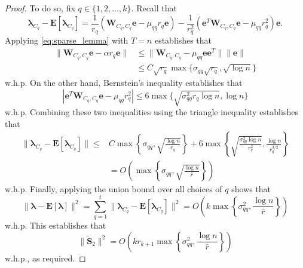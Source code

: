 \documentclass[twoside,11pt]{article}
\newcommand{\E}{\mathbf{E}}
\newcommand{\St}{\bs{\tilde S}}
\newcommand{\e}{\bs {e}}
\newcommand{\bs}{\boldsymbol}
\newcommand{\W}{\bs {W}}
\newcommand{\0}{\bs{0}}
\newcommand{\rbra}[1]{\ensuremath{\left( #1 \right)}} %
\newcommand{\bra}[1]{\ensuremath{\left\{ #1 \right\}}} %
\begin{document}
{\begin{proof}
\newcommand{\bl}{\bs{\lambda}}
To do so, fix $q \in \{1,2,\dots, k\}$. Recall that
\[
	\bl_{C_q} - \E[\bl_{C_q}] = \frac{1}{r_q} ( \W_{C_q, C_q} \e - \mu_{qq} r_q \e )
		- \frac{1}{r_q^2} (\e^T \W_{C_q, C_q} \e - \mu_{qq} r_q^2) \e.
\]
Applying \eqref{eq:sparse_lemma} with $T = n$ establishes that
\begin{align*}
	\| \W_{C_q, C_q} \e - \alpha r_q \e \| &\le  \|\W_{C_q, C_q}  - \mu_{qq} \e\e^T \| \|\e\| \\
	& \le C \sqrt{r_q} \max\{ \sigma_{qq} \sqrt{ r_q}, \sqrt{\log n} \}
\end{align*}
w.h.p.
On the other hand, Bernstein's inequality establishes that
\[
	|  \e^T \W_{C_q, C_q} \e - \mu_{qq} r_q^2 | \le 6 \max \{ \sqrt{\sigma_{qq}^2 r_q \log n}, \log n \}
\]
w.h.p.
Combining these two inequalities using the triangle inequality establishes that
\begin{align*}
	\| \bl_{C_q} - \E[\bl_{C_q}] \| \le &C \max \bra{ \sigma_{qq}, \sqrt{\frac{\log n}{r_q } } }
		+ 6 \max \bra { \sqrt{ \frac{\sigma_{qq}^2 \log n}{r_q^2}}, \frac{\log n}{r_q^{3/2} } } \\
		&= O \rbra{ \max \bra{ \sigma_{qq}, \sqrt{ \frac{ \log n}{\hat r} } } }
\end{align*}
w.h.p.
Finally, applying the union bound over all choices of $q$ shows that
\[
	\| \bl - \E [ \bl ] \|^2 = \sum_{q=1}^t \| \bl_{C_q} - \E[\bl_{C_q}] \|^2
		= O \rbra{  k \max \bra{ \sigma_{qq}^2, \frac{\log n}{\hat r} } }
\]
w.h.p.
This establishes that
\[
	\|\St_2\|^2 = O\rbra{k r_{k+1} \max \bra{ \sigma_{qq}^2, \frac{\log n}{\hat r} } }
\]
w.h.p., as required.
\end{proof}





%

\begingroup
\raggedright


\endgroup
\end{document}
